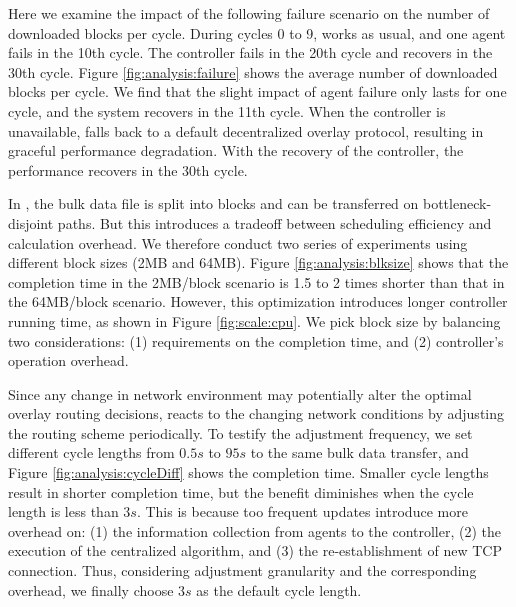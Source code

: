 
Here we examine the impact of the following failure scenario on the number of downloaded blocks per cycle. During cycles 0 to 9, \name works as usual, and one agent fails in the 10th cycle. The controller fails in the 20th cycle and recovers in the 30th cycle. Figure \ref{fig:analysis:failure} shows the average number of downloaded blocks per cycle. We find that the slight impact of agent failure only lasts for one cycle, and the system recovers in the 11th cycle. When the controller is unavailable, \name falls back to a default decentralized overlay protocol, resulting in graceful performance degradation. With the recovery of the controller, the performance recovers in the 30th cycle.

\label{subsec:evaluation:benchmarks:parameters}

 In \name, the bulk data file is split into blocks and can be transferred on bottleneck-disjoint paths. But this introduces a tradeoff between scheduling efficiency and calculation overhead. We therefore conduct two series of experiments using different block sizes (2MB and 64MB). Figure \ref{fig:analysis:blksize} shows that the completion time in the 2MB/block scenario is 1.5 to 2 times shorter than that in the 64MB/block scenario. 
However, this optimization introduces longer controller running time, as shown in Figure \ref{fig:scale:cpu}. We pick block size by balancing two considerations: (1) requirements on the completion time, and (2) controller's operation overhead.

 Since any change in network environment may potentially alter the optimal overlay routing decisions, \name reacts to the changing network conditions by adjusting the routing scheme periodically. To testify the adjustment frequency, we set different cycle lengths from $0.5s$ to $95s$ to the same bulk data transfer, and Figure \ref{fig:analysis:cycleDiff} shows the completion time. Smaller cycle lengths result in shorter completion time, but the benefit diminishes when the cycle length is less than $3s$. This is because too frequent updates introduce more overhead on: (1) the information collection from agents to the controller, (2) the execution of the centralized algorithm, and (3) the re-establishment of new TCP connection. Thus, considering adjustment granularity and the corresponding overhead, we finally choose $3s$ as the default cycle length.


